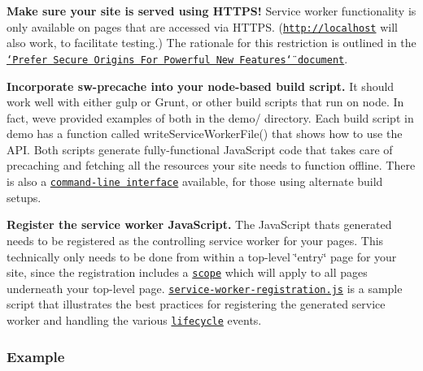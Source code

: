 \begin{DoxyEnumerate}
\item {\bfseries Make sure your site is served using H\+T\+T\+P\+S!} Service worker functionality is only available on pages that are accessed via H\+T\+T\+PS. ({\ttfamily \href{http://localhost}{\tt http\+://localhost}} will also work, to facilitate testing.) The rationale for this restriction is outlined in the \href{http://www.chromium.org/Home/chromium-security/prefer-secure-origins-for-powerful-new-features}{\tt \char`\"{}\+Prefer Secure Origins For Powerful New Features\char`\"{} document}.
\item {\bfseries Incorporate {\ttfamily sw-\/precache} into your {\ttfamily node}-\/based build script.} It should work well with either {\ttfamily gulp} or {\ttfamily Grunt}, or other build scripts that run on {\ttfamily node}. In fact, we\textquotesingle{}ve provided examples of both in the {\ttfamily demo/} directory. Each build script in {\ttfamily demo} has a function called {\ttfamily write\+Service\+Worker\+File()} that shows how to use the A\+PI. Both scripts generate fully-\/functional Java\+Script code that takes care of precaching and fetching all the resources your site needs to function offline. There is also a \href{#command-line-interface}{\tt command-\/line interface} available, for those using alternate build setups.
\item {\bfseries Register the service worker Java\+Script.} The Java\+Script that\textquotesingle{}s generated needs to be registered as the controlling service worker for your pages. This technically only needs to be done from within a top-\/level \char`\"{}entry\char`\"{} page for your site, since the registration includes a \href{https://slightlyoff.github.io/ServiceWorker/spec/service_worker/index.html#service-worker-registration-scope}{\tt {\ttfamily scope}} which will apply to all pages underneath your top-\/level page. \href{/demo/app/js/service-worker-registration.js}{\tt {\ttfamily service-\/worker-\/registration.\+js}} is a sample script that illustrates the best practices for registering the generated service worker and handling the various \href{https://slightlyoff.github.io/ServiceWorker/spec/service_worker/index.html#service-worker-state.1}{\tt lifecycle} events.
\end{DoxyEnumerate}

\subsubsection*{Example}

